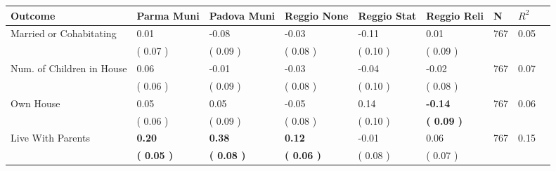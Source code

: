 \begin{tabular}{L{6.2cm} C{1.8cm} C{1.8cm} C{1.8cm} C{1.8cm} C{1.8cm} C{1.8cm} C{0.3cm} C{0.3cm}}
\toprule
 \textbf{Outcome} & \textbf{Parma Muni} & \textbf{Padova Muni} & \textbf{Reggio None} & \textbf{Reggio Stat} & \textbf{Reggio Reli} & \textbf{N} & \textbf{$ R^2$} \\
\midrule
Married or Cohabitating &      0.01 &     -0.08 &     -0.03 &     -0.11 &      0.01  & 767 &       0.05 \\ 
 & (     0.07 ) & (     0.09 ) & (     0.08 ) & (     0.10 ) & (     0.09 )  & \\
Num. of Children in House &      0.06 &     -0.01 &     -0.03 &     -0.04 &     -0.02  & 767 &       0.07 \\ 
 & (     0.06 ) & (     0.09 ) & (     0.08 ) & (     0.10 ) & (     0.08 )  & \\
Own House &      0.05 &      0.05 &     -0.05 &      0.14 & \textbf{    -0.14}  & 767 &       0.06 \\ 
 & (     0.06 ) & (     0.09 ) & (     0.08 ) & (     0.10 ) & \textbf{(     0.09 )}  & \\
Live With Parents & \textbf{     0.20} & \textbf{     0.38} & \textbf{     0.12} &     -0.01 &      0.06  & 767 &       0.15 \\ 
 & \textbf{(     0.05 )} & \textbf{(     0.08 )} & \textbf{(     0.06 )} & (     0.08 ) & (     0.07 )  & \\
\bottomrule
\end{tabular}
